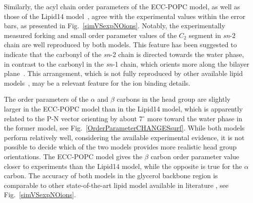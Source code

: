  
Similarly, the acyl chain order parameters of the ECC-POPC model, as well as those of the Lipid14 model~\citep{dickson14}, agree with the experimental values within the error bars, as presented in Fig.~\ref{simVSexpNOions}. Notably, the experimentally measured forking and small order parameter values of the $C_2$ segment in {\it sn}-2 chain are well reproduced by both models. This feature has been suggested to indicate that the carbonyl of the {\it sn}-2 chain is directed towards the water phase, in contrast to the carbonyl in the {\it sn}-1 chain, which orients more along the bilayer plane~\citep{seelig75,schindler75,gawrisch92}. 
This arrangement, which is not fully reproduced by other available lipid models~\citep{ollila16}, may be a relevant feature for the ion binding details. 
 
The order parameters of the $\alpha$ and $\beta$ carbons in the head group are slightly larger in the ECC-POPC model than in the Lipid14 model, which is apparently related to the P-N vector orienting by about 7$^{\circ}$ more toward the water phase in the former model, see Fig.~\ref{OrderParameterCHANGESsurf}. While both models perform relatively well, considering the available experimental evidence, it is not possible to decide which of the two models provides more realistic head group orientations. The ECC-POPC model gives the $\beta$ carbon order parameter value closer to experiments than the Lipid14 model, while the opposite is true for the $\alpha$ carbon. The accuracy of both models in the glycerol backbone region is comparable to other state-of-the-art lipid model available in literature \citep{botan15}, see Fig.~\ref{simVSexpNOions}. 


 
 

